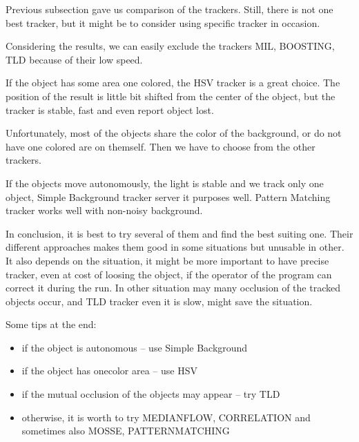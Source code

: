 Previous subsection gave us comparison of the trackers. Still, there is not one
best tracker, but it might be to consider using specific tracker in occasion.

Considering the results, we can easily exclude the trackers MIL, BOOSTING, TLD
because of their low speed. 

If the object has some area one colored, the HSV tracker is a great choice. The
position of the result is little bit shifted from the center of the object, but
the tracker is stable, fast and even report object lost.

Unfortunately, most of the objects share the color of the background, or do not
have one colored are on themself. Then we have to choose from the other
trackers.

If the objects move autonomously, the light is stable and we track only one
object, Simple Background tracker server it purposes well. Pattern Matching
tracker works well with non-noisy background.

In conclusion, it is best to try several of them and find the best suiting one.
Their different approaches makes them good in some situations but unusable in
other. It also depends on the situation, it might be more important to have
precise tracker, even at cost of loosing the object, if the operator of the
program can correct it during the run. In other situation may many occlusion of
the tracked objects occur, and TLD tracker even it is slow, might save the
situation.

Some tips at the end:
\begin{itemize}
\item if the object is autonomous -- use Simple Background
\item if the object has onecolor area -- use HSV
\item if the mutual occlusion of the objects may appear -- try TLD
\item otherwise, it is worth to try MEDIANFLOW, CORRELATION and sometimes also MOSSE, PATTERNMATCHING
\end{itemize}

